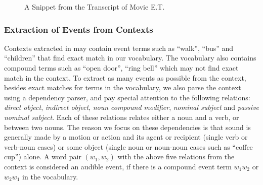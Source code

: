 \begin{figure}[th]
\centering
{}
\caption{A Snippet from the Transcript of Movie E.T.}
\label{fig:ET}
\end{figure}


%



\subsubsection{Extraction of Events from Contexts}
\label{subsec:lists}
Contexts extracted in  may contain event terms such as ``walk'',
``bus'' and ``children'' that find exact match in our vocabulary.
The vocabulary also contains compound terms such as ``open door'', 
``ring bell'' which may not find exact match in the context. To extract
as many events as possible from the context, besides exact matches for
terms in the vocabulary, we also parse the context using a
dependency parser, and pay special attention to the following relations:
{\em direct object}, {\em indirect object}, {\em noun compound modifier},
{\em nominal subject} and {\em passive nominal subject}.
Each of these relations relates either a noun and a verb, or between
two nouns. The reason we focus on these dependencies is that sound is generally
made by a motion or action and its agent or recipient (single verb or 
verb-noun cases) 
or some object (single noun or noun-noun cases such as ``coffee cup'') alone. 
A word pair $(w_1, w_2)$
with the above five relations from the context is considered an audible
event, if there is a compound event term $w_1w_2$ or $w_2w_1$ in the 
vocabulary. 
 
